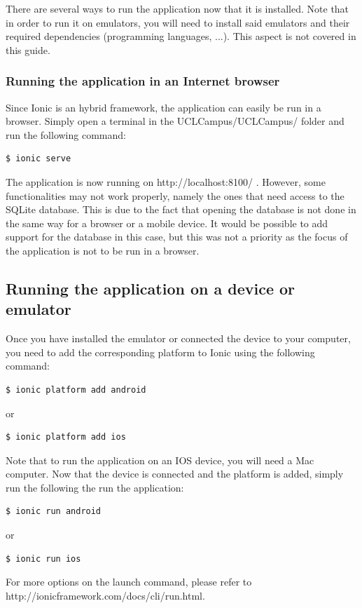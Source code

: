 \documentclass[11pt, a4paper]{report}
\begin{document}
There are several ways to run the application now that it is installed. Note that in order to run it on emulators, you will need to install said emulators and their required dependencies (programming languages, ...). This aspect is not covered in this guide.

\subsubsection{Running the application in an Internet browser}

Since Ionic is an hybrid framework, the application can easily be run in a browser. Simply open a terminal in the UCLCampus/UCLCampus/ folder and run the following command:

\begin{lstlisting}[language=bash]
   $ ionic serve
\end{lstlisting} 
The application is now running on http://localhost:8100/ . However, some functionalities may not work properly, namely the ones that need access to the SQLite database. This is due to the fact that opening the database is not done in the same way for a browser or a mobile device. It would be possible to add support for the database in this case, but this was not a priority as the focus of the application is not to be run in a browser.
\subsection{Running the application on a device or emulator}
Once you have installed the emulator or connected the device to your computer, you need to add the corresponding platform to Ionic using the following command:
\begin{lstlisting}[language=bash]
   $ ionic platform add android
\end{lstlisting} 

or

\begin{lstlisting}[language=bash]
   $ ionic platform add ios
\end{lstlisting} 
Note that to run the application on an IOS device, you will need a Mac computer. Now that the device is connected and the platform is added, simply run the following the run the application:
\begin{lstlisting}[language=bash]
   $ ionic run android
\end{lstlisting} 

or 

\begin{lstlisting}[language=bash]
   $ ionic run ios
\end{lstlisting} 
For more options on the launch command, please refer to http://ionicframework.com/docs/cli/run.html.
\end{document}
